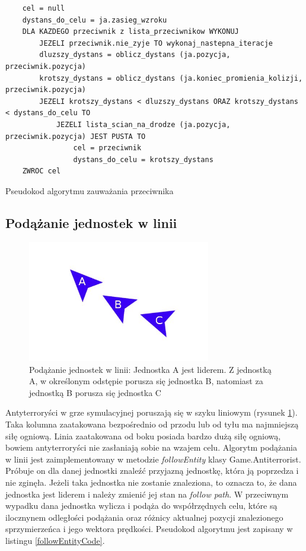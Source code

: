 \begin{table}
\begin{center}
\begin{lstlisting}
	cel = null
	dystans_do_celu = ja.zasieg_wzroku
	DLA KAZDEGO przeciwnik z lista_przeciwnikow WYKONUJ
		JEZELI przeciwnik.nie_zyje TO wykonaj_nastepna_iteracje
		dluzszy_dystans = oblicz_dystans (ja.pozycja, przeciwnik.pozycja)
		krotszy_dystans = oblicz_dystans (ja.koniec_promienia_kolizji, przeciwnik.pozycja)
		JEZELI krotszy_dystans < dluzszy_dystans ORAZ krotszy_dystans < dystans_do_celu TO
			JEZELI lista_scian_na_drodze (ja.pozycja, przeciwnik.pozycja) JEST PUSTA TO
				cel = przeciwnik
				dystans_do_celu = krotszy_dystans		
	ZWROC cel	
\end{lstlisting}
\caption {Pseudokod algorytmu zauważania przeciwnika}
\label{detectionCode}
\end{center}
\end{table}

\subsection{Podążanie jednostek w linii}

\begin{figure}
\begin{center}
	\includegraphics[width=80mm,height=53mm]{images/followEntity}
	\caption[Podążanie jednostek w linii]{Podążanie jednostek w linii: Jednostka A jest liderem. Z jednostką A, w określonym odstępie porusza się jednostka B, natomiast za jednostką B porusza się jednostka C\label{followEntityImage}}
\end{center}
\end{figure}

Antyterroryści w grze symulacyjnej poruszają się w szyku liniowym (rysunek \ref{followEntityImage}). Taka kolumna zaatakowana bezpośrednio od przodu lub od tyłu ma najmniejszą siłę ogniową. Linia zaatakowana od boku posiada bardzo dużą siłę ogniową, bowiem antyterroryści nie zasłaniają sobie na wzajem celu. Algorytm podążania w linii jest zaimplementowany w metodzie \emph{followEntity} klasy Game.Antiterrorist. Próbuje on dla danej jednostki znaleźć przyjazną jednostkę, która ją poprzedza i nie zginęła. Jeżeli taka jednostka nie zostanie znaleziona, to oznacza to, że dana jednostka jest liderem i należy zmienić jej stan na \emph{follow path}. W przeciwnym wypadku dana jednostka wylicza i podąża do współrzędnych celu, które są ilocznynem odległości podążania oraz różnicy aktualnej pozycji znalezionego sprzymierzeńca i jego wektora prędkości. Pseudokod algorytmu jest zapisany w listingu \ref{followEntityCode}.

